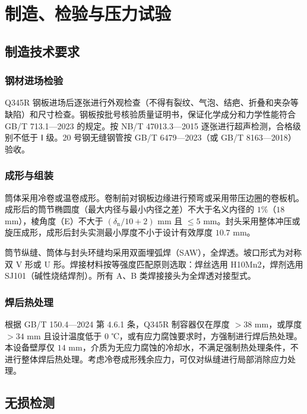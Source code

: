 
\chapter{制造、检验与压力试验}

\section{制造技术要求}

\subsection{钢材进场检验}

Q345R 钢板进场后逐张进行外观检查（不得有裂纹、气泡、结疤、折叠和夹杂等缺陷）和尺寸检查。钢板按批号核验质量证明书，保证化学成分和力学性能符合 GB/T 713.1—2023 的规定\cite{gbt713-1-2023}。按 NB/T 47013.3—2015 逐张进行超声检测，合格级别不低于 Ⅰ 级\cite{nbt47013-2015}。20 号钢无缝钢管按 GB/T 6479—2023\cite{gbt6479-2023}（或 GB/T 8163—2018\cite{gbt8163-2018}）验收。

\subsection{成形与组装}

筒体采用冷卷或温卷成形。卷制前对钢板边缘进行预弯或采用带压边圈的卷板机。成形后的筒节椭圆度（最大内径与最小内径之差）不大于名义内径的 $1\%$（$18$ mm），棱角度（E）不大于 $(\delta_{\mathrm{n}}/10 + 2)$ mm 且 $\le 5$ mm\cite{hgt20584-2020}。封头采用整体冲压或旋压成形，成形后封头实测最小厚度不小于设计有效厚度 $10.7$ mm。

筒节纵缝、筒体与封头环缝均采用双面埋弧焊（SAW），全焊透。坡口形式为对称双 V 形或 U 形。焊接材料按等强度匹配原则选取：焊丝选用 H10Mn2，焊剂选用 SJ101（碱性烧结焊剂）。所有 A、B 类焊接接头为全焊透对接型式。

\subsection{焊后热处理}

根据 GB/T 150.4—2024 第 4.6.1 条\cite{gbt150-2024}，Q345R 制容器仅在厚度 $>38$ mm，或厚度 $>34$ mm 且设计温度低于 $0$ ℃，或有应力腐蚀要求时，方强制进行焊后热处理。本设备壁厚仅 $14$ mm，介质为无应力腐蚀的冷却水，不满足强制热处理条件，不进行整体焊后热处理。考虑冷卷成形残余应力，可仅对纵缝进行局部消除应力处理。

\section{无损检测}

